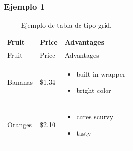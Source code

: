 \documentclass[
  letterpaper,
  DIV=11,
  numbers=noendperiod]{scrartcl}
\providecommand{\tightlist}{%
  \setlength{\itemsep}{0pt}\setlength{\parskip}{0pt}}\usepackage{longtable,booktabs,array}
\begin{document}
\subsubsection{Ejemplo 1}\label{ejemplo-1}

\begin{longtable}[]{@{}
  >{\raggedright\arraybackslash}p{}
  >{\raggedright\arraybackslash}p{}
  >{\raggedright\arraybackslash}p{}@{}}
\caption{Ejemplo de tabla de tipo grid.}\tabularnewline
\toprule\noalign{}
\begin{minipage}[b]{\linewidth}\raggedright
Fruit
\end{minipage} & \begin{minipage}[b]{\linewidth}\raggedright
Price
\end{minipage} & \begin{minipage}[b]{\linewidth}\raggedright
Advantages
\end{minipage} \\
\midrule\noalign{}
\endfirsthead
\toprule\noalign{}
\begin{minipage}[b]{\linewidth}\raggedright
Fruit
\end{minipage} & \begin{minipage}[b]{\linewidth}\raggedright
Price
\end{minipage} & \begin{minipage}[b]{\linewidth}\raggedright
Advantages
\end{minipage} \\
\midrule\noalign{}
\endhead
\bottomrule\noalign{}
\endlastfoot
Bananas & \$1.34 & \begin{minipage}[t]{\linewidth}\raggedright
\begin{itemize}
\tightlist
\item
  built-in wrapper
\item
  bright color
\end{itemize}
\end{minipage} \\
Oranges & \$2.10 & \begin{minipage}[t]{\linewidth}\raggedright
\begin{itemize}
\tightlist
\item
  cures scurvy
\item
  tasty
\end{itemize}
\end{minipage} \\
\end{longtable}
\end{document}
